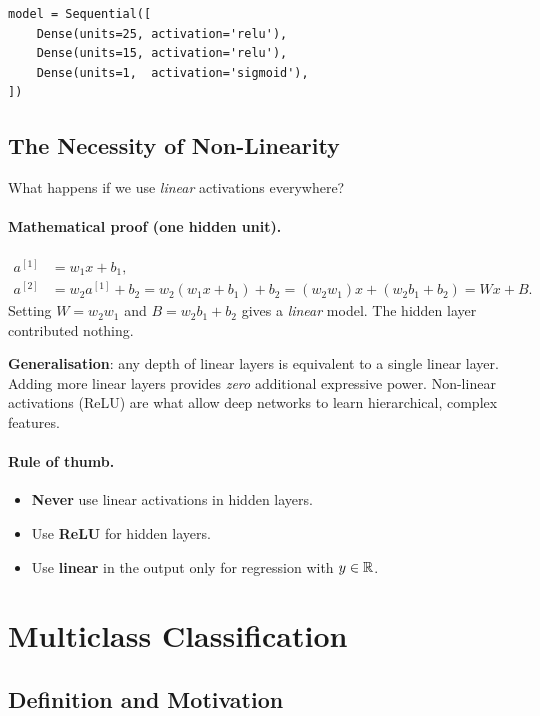 \begin{lstlisting}[caption={Recommended: ReLU hidden layers with sigmoid output}]
model = Sequential([
    Dense(units=25, activation='relu'),
    Dense(units=15, activation='relu'),
    Dense(units=1,  activation='sigmoid'),
])
\end{lstlisting}

\subsection{The Necessity of Non-Linearity}

What happens if we use \emph{linear} activations everywhere?

\paragraph{Mathematical proof (one hidden unit).}
\begin{align*}
a^{[1]}&=w_1 x+b_1,\\
a^{[2]}&=w_2 a^{[1]}+b_2=w_2(w_1 x+b_1)+b_2=(w_2 w_1)x+(w_2 b_1+b_2)=Wx+B.
\end{align*}
Setting $W=w_2 w_1$ and $B=w_2 b_1+b_2$ gives a \emph{linear} model. The
hidden layer contributed nothing.

\textbf{Generalisation}: any depth of linear layers is equivalent to a single
linear layer. Adding more linear layers provides \emph{zero} additional
expressive power. Non-linear activations (ReLU) are what allow deep networks
to learn hierarchical, complex features.

\paragraph{Rule of thumb.}
\begin{itemize}
\item \textbf{Never} use linear activations in hidden layers.
\item Use \textbf{ReLU} for hidden layers.
\item Use \textbf{linear} in the output only for regression with $y\in\mathbb{R}$.
\end{itemize}

\section{Multiclass Classification}

\subsection{Definition and Motivation}

